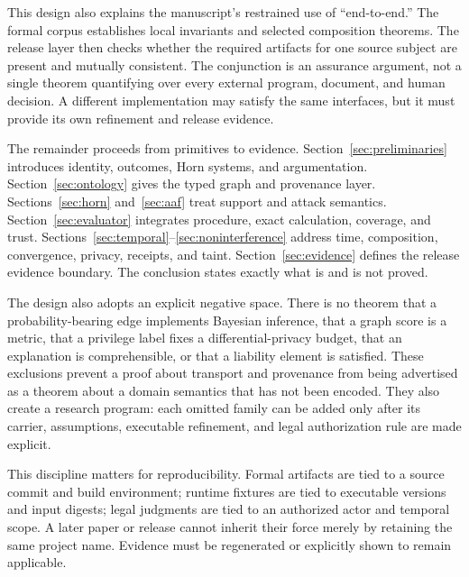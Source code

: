 This design also explains the manuscript's restrained use of ``end-to-end.'' The formal corpus establishes local invariants and selected composition theorems. The release layer then checks whether the required artifacts for one source subject are present and mutually consistent. The conjunction is an assurance argument, not a single theorem quantifying over every external program, document, and human decision. A different implementation may satisfy the same interfaces, but it must provide its own refinement and release evidence.

The remainder proceeds from primitives to evidence. Section~\ref{sec:preliminaries} introduces identity, outcomes, Horn systems, and argumentation. Section~\ref{sec:ontology} gives the typed graph and provenance layer. Sections~\ref{sec:horn} and~\ref{sec:aaf} treat support and attack semantics. Section~\ref{sec:evaluator} integrates procedure, exact calculation, coverage, and trust. Sections~\ref{sec:temporal}--\ref{sec:noninterference} address time, composition, convergence, privacy, receipts, and taint. Section~\ref{sec:evidence} defines the release evidence boundary. The conclusion states exactly what is and is not proved.

The design also adopts an explicit negative space. There is no theorem that a probability-bearing edge implements Bayesian inference, that a graph score is a metric, that a privilege label fixes a differential-privacy budget, that an explanation is comprehensible, or that a liability element is satisfied. These exclusions prevent a proof about transport and provenance from being advertised as a theorem about a domain semantics that has not been encoded. They also create a research program: each omitted family can be added only after its carrier, assumptions, executable refinement, and legal authorization rule are made explicit.

This discipline matters for reproducibility. Formal artifacts are tied to a source commit and build environment; runtime fixtures are tied to executable versions and input digests; legal judgments are tied to an authorized actor and temporal scope. A later paper or release cannot inherit their force merely by retaining the same project name. Evidence must be regenerated or explicitly shown to remain applicable.

